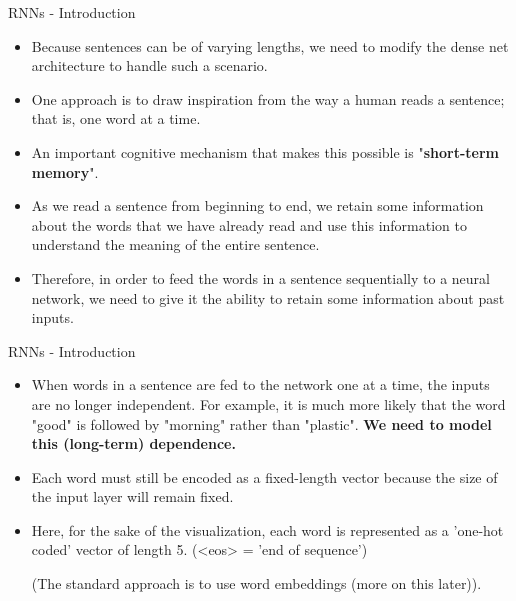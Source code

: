 \documentclass[11pt,compress,t,notes=noshow]{beamer}
\begin{document}
\begin{frame} {RNNs - Introduction}
  \begin{itemize}
    \item Because sentences can be of varying lengths, we need to modify the dense net architecture to handle such a scenario.
    \item One approach is to draw inspiration from the way a human reads a sentence; that is, one word at a time.
    \item An important cognitive mechanism that makes this possible is "\textbf{short-term memory}".
    \item As we read a sentence from beginning to end, we retain some information about the words that we have already read and use this information to understand the meaning of the entire sentence.
    \item Therefore, in order to feed the words in a sentence sequentially to a neural network, we need to give it the ability to retain some information about past inputs.
  \end{itemize}
\end{frame}
 
\begin{frame} {RNNs - Introduction}
  \begin{itemize}
   \item %
    When words in a sentence are fed to the network one at a time, the inputs are no longer independent. For example, it is much more likely that the word "good" is followed by "morning" rather than "plastic". \textbf{We need to model this (long-term) dependence.} 
    \item %
    Each word must still be encoded as a fixed-length vector because the size of the input layer will remain fixed.
    \item Here, for the sake of the visualization, each word is represented as a 'one-hot coded' vector of length 5. (<eos> = 'end of sequence')
    \begin{figure}
      \centering
  \end{figure}
    (The standard approach is to use word embeddings (more on this later)).
  \end{itemize}
\end{frame}
\end{document}
